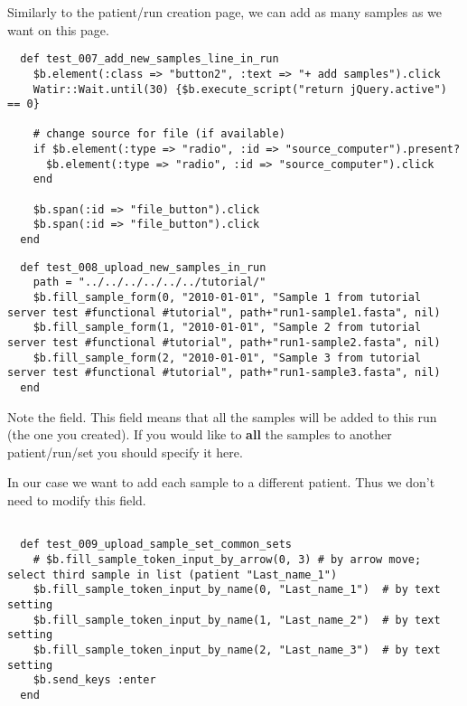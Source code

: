 Similarly to the patient/run creation page, we can add as many samples as we
want on this page.

\begin{verbatim}
  def test_007_add_new_samples_line_in_run
    $b.element(:class => "button2", :text => "+ add samples").click
    Watir::Wait.until(30) {$b.execute_script("return jQuery.active") == 0}

    # change source for file (if available)
    if $b.element(:type => "radio", :id => "source_computer").present?
      $b.element(:type => "radio", :id => "source_computer").click
    end
  
    $b.span(:id => "file_button").click
    $b.span(:id => "file_button").click
  end

\end{verbatim}

\begin{verbatim}
  def test_008_upload_new_samples_in_run
    path = "../../../../../../tutorial/"
    $b.fill_sample_form(0, "2010-01-01", "Sample 1 from tutorial server test #functional #tutorial", path+"run1-sample1.fasta", nil)
    $b.fill_sample_form(1, "2010-01-01", "Sample 2 from tutorial server test #functional #tutorial", path+"run1-sample2.fasta", nil)
    $b.fill_sample_form(2, "2010-01-01", "Sample 3 from tutorial server test #functional #tutorial", path+"run1-sample3.fasta", nil)
  end

\end{verbatim}

Note the  field. This field means that all the samples will
be added to this run (the one you created). If you would like to \textbf{all}
the samples to another patient/run/set you should specify it here.

In our case we want to add each sample to a different patient. Thus we don't
need to modify this field.

\begin{verbatim}
 
  def test_009_upload_sample_set_common_sets
    # $b.fill_sample_token_input_by_arrow(0, 3) # by arrow move; select third sample in list (patient "Last_name_1")
    $b.fill_sample_token_input_by_name(0, "Last_name_1")  # by text setting
    $b.fill_sample_token_input_by_name(1, "Last_name_2")  # by text setting
    $b.fill_sample_token_input_by_name(2, "Last_name_3")  # by text setting
    $b.send_keys :enter
  end

\end{verbatim}

